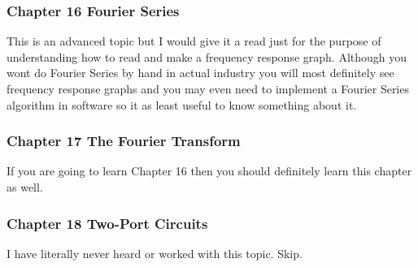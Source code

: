 \documentclass[11pt]{article}
\begin{document}
\subsubsection{Chapter 16 Fourier Series}
\label{sec:orgf821672}
This is an advanced topic but I would give it a read just for the purpose of understanding how to
read and make a frequency response graph. Although you wont do Fourier Series by hand in actual
industry you will most definitely see frequency response graphs and you may even need to implement
a Fourier Series algorithm in software so it as least useful to know something about it.
\subsubsection{Chapter 17 The Fourier Transform}
\label{sec:org1ef4b45}
If you are going to learn Chapter 16 then you should definitely learn this chapter as well.
\subsubsection{Chapter 18 Two-Port Circuits}
\label{sec:org3731eac}
I have literally never heard or worked with this topic. Skip.
\end{document}
